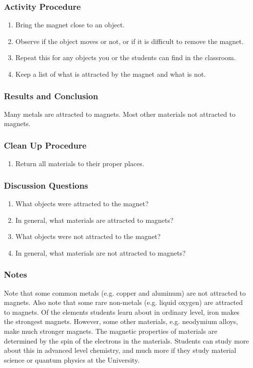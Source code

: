 \subsubsection*{Activity Procedure}
\begin{enumerate}
\item{Bring the magnet close to an object.} 
\item{Observe if the object moves or not, or if it is difficult to remove the magnet.} 
\item{Repeat this for any objects you or the students can find in the classroom.} 
\item{Keep a list of what is attracted by the magnet and what is not.} 
\end{enumerate}

\subsubsection*{Results and Conclusion}
Many metals are attracted to magnets. Most other materials not attracted to magnets.

\subsubsection*{Clean Up Procedure}
\begin{enumerate}
\item{Return all materials to their proper places.} 
\end{enumerate}

\subsubsection*{Discussion Questions}
\begin{enumerate}
\item{What objects were attracted to the magnet?}
\item{In general, what materials are attracted to magnets?}
\item{What objects were not attracted to the magnet?}
\item{In general, what materials are not attracted to magnets?}
\end{enumerate}

\subsubsection*{Notes}
Note that some common metals (e.g. copper and aluminum) are not attracted to magnets. Also note that some rare non-metals (e.g. liquid oxygen) are attracted to magnets. Of the elements students learn about in ordinary level, iron makes the strongest magnets. However, some other materials, e.g. neodymium alloys, make much stronger magnets. The magnetic properties of materials are determined by the spin of the electrons in the materials. Students can study more about this in advanced level chemistry, and much more if they study material science or quantum physics at the University.

